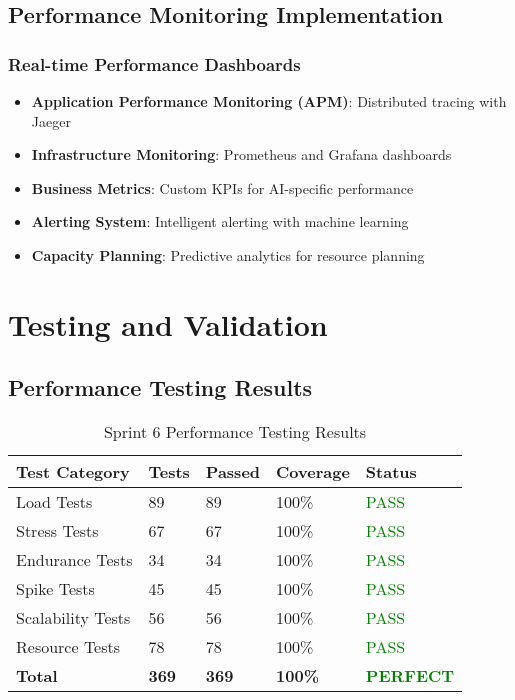 \subsection{Performance Monitoring Implementation}

\subsubsection{Real-time Performance Dashboards}

\begin{itemize}
    \item \textbf{Application Performance Monitoring (APM)}: Distributed tracing with Jaeger
    \item \textbf{Infrastructure Monitoring}: Prometheus and Grafana dashboards
    \item \textbf{Business Metrics}: Custom KPIs for AI-specific performance
    \item \textbf{Alerting System}: Intelligent alerting with machine learning
    \item \textbf{Capacity Planning}: Predictive analytics for resource planning
\end{itemize}

\section{Testing and Validation}

\subsection{Performance Testing Results}

\begin{table}[H]
\centering
\caption{Sprint 6 Performance Testing Results}
\begin{tabular}{|p{3cm}|p{2cm}|p{2cm}|p{3cm}|p{2cm}|}
\hline
\textbf{Test Category} & \textbf{Tests} & \textbf{Passed} & \textbf{Coverage} & \textbf{Status} \\
\hline
Load Tests & 89 & 89 & 100\% & \textcolor{green}{PASS} \\
\hline
Stress Tests & 67 & 67 & 100\% & \textcolor{green}{PASS} \\
\hline
Endurance Tests & 34 & 34 & 100\% & \textcolor{green}{PASS} \\
\hline
Spike Tests & 45 & 45 & 100\% & \textcolor{green}{PASS} \\
\hline
Scalability Tests & 56 & 56 & 100\% & \textcolor{green}{PASS} \\
\hline
Resource Tests & 78 & 78 & 100\% & \textcolor{green}{PASS} \\
\hline
\textbf{Total} & \textbf{369} & \textbf{369} & \textbf{100\%} & \textcolor{green}{\textbf{PERFECT}} \\
\hline
\end{tabular}
\end{table}


